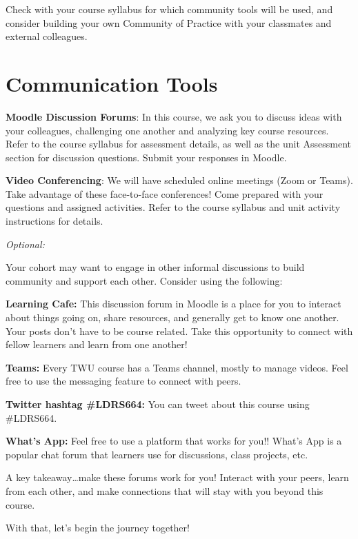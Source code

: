 \documentclass[
]{book}
\begin{document}
Check with your course syllabus for which community tools will be used, and consider building your own Community of Practice with your classmates and external colleagues.

\hypertarget{communication-tools}{%
\section{Communication Tools}\label{communication-tools}}

\textbf{Moodle Discussion Forums}: In this course, we ask you to discuss ideas with your colleagues, challenging one another and analyzing key course resources. Refer to the course syllabus for assessment details, as well as the unit Assessment section for discussion questions. Submit your responses in Moodle.

\textbf{Video Conferencing}: We will have scheduled online meetings (Zoom or Teams). Take advantage of these face-to-face conferences! Come prepared with your questions and assigned activities. Refer to the course syllabus and unit activity instructions for details.

\emph{Optional:}

Your cohort may want to engage in other informal discussions to build community and support each other. Consider using the following:

\textbf{Learning Cafe:} This discussion forum in Moodle is a place for you to interact about things going on, share resources, and generally get to know one another. Your posts don't have to be course related. Take this opportunity to connect with fellow learners and learn from one another!

\textbf{Teams:} Every TWU course has a Teams channel, mostly to manage videos. Feel free to use the messaging feature to connect with peers.

\textbf{Twitter hashtag \#LDRS664:} You can tweet about this course using \#LDRS664.

\textbf{What's App:} Feel free to use a platform that works for you!! What's App is a popular chat forum that learners use for discussions, class projects, etc.

A key takeaway\ldots make these forums work for you! Interact with your peers, learn from each other, and make connections that will stay with you beyond this course.

With that, let's begin the journey together!
\end{document}
